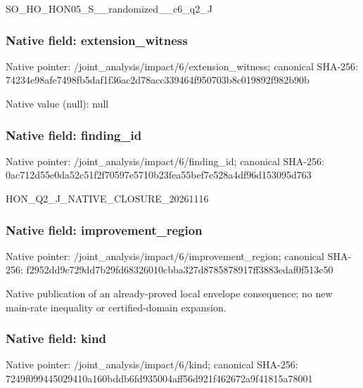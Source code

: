 \documentclass[10pt,a4paper]{article}
\begin{document}
\begingroup\raggedright\sloppy SO\_\allowbreak{}HO\_\allowbreak{}HON05\_\allowbreak{}S\_\allowbreak{}\_\allowbreak{}randomized\_\allowbreak{}\_\allowbreak{}c6\_\allowbreak{}q2\_\allowbreak{}J\par\endgroup

\subsubsection{Native field: extension\_\allowbreak{}witness}
Native pointer: /joint\_\allowbreak{}analysis/impact/6/extension\_\allowbreak{}witness; canonical SHA-256: 74234e98afe7498fb5daf1f36ac2d78acc339464f950703b8c019892f982b90b

Native value (null): null

\subsubsection{Native field: finding\_\allowbreak{}id}
Native pointer: /joint\_\allowbreak{}analysis/impact/6/finding\_\allowbreak{}id; canonical SHA-256: 0ac712d55e0da52c51f2f70597e5710b23fea55bef7e528a4df96d153095d763

\begingroup\raggedright\sloppy HON\_\allowbreak{}Q2\_\allowbreak{}J\_\allowbreak{}NATIVE\_\allowbreak{}CLOSURE\_\allowbreak{}20261116\par\endgroup

\subsubsection{Native field: improvement\_\allowbreak{}region}
Native pointer: /joint\_\allowbreak{}analysis/impact/6/improvement\_\allowbreak{}region; canonical SHA-256: f2952dd9c729dd7b29fd68326010cbba327d8785878917ff3883edaf0f513c50

\begingroup\raggedright\sloppy Native publication of an already-proved local envelope consequence;\allowbreak{} no new main-rate inequality or certified-domain expansion.\par\endgroup

\subsubsection{Native field: kind}
Native pointer: /joint\_\allowbreak{}analysis/impact/6/kind; canonical SHA-256: 7249f099445029410a160bddb6fd935004aff56d921f462672a9f41815a78001
\end{document}
